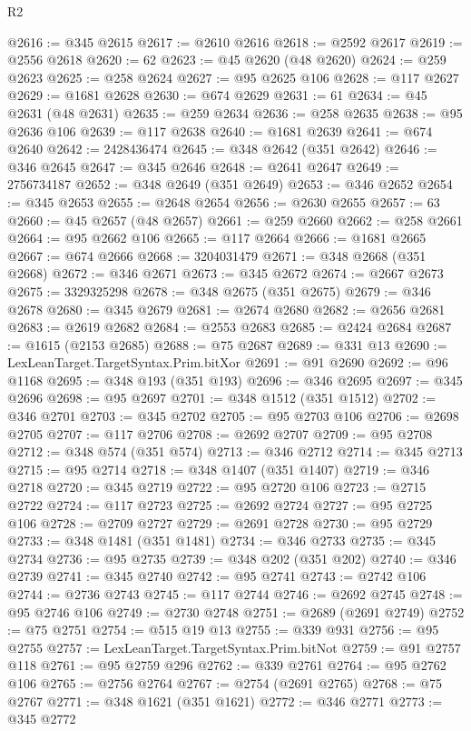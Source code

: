\begin{lexlean}{R2}
\begin{coremodule}
@2616 := @345 @2615
@2617 := @2610 @2616
@2618 := @2592 @2617
@2619 := @2556 @2618
@2620 := 62
@2623 := @45 @2620 (@48 @2620)
@2624 := @259 @2623
@2625 := @258 @2624
@2627 := @95 @2625 @106
@2628 := @117 @2627
@2629 := @1681 @2628
@2630 := @674 @2629
@2631 := 61
@2634 := @45 @2631 (@48 @2631)
@2635 := @259 @2634
@2636 := @258 @2635
@2638 := @95 @2636 @106
@2639 := @117 @2638
@2640 := @1681 @2639
@2641 := @674 @2640
@2642 := 2428436474
@2645 := @348 @2642 (@351 @2642)
@2646 := @346 @2645
@2647 := @345 @2646
@2648 := @2641 @2647
@2649 := 2756734187
@2652 := @348 @2649 (@351 @2649)
@2653 := @346 @2652
@2654 := @345 @2653
@2655 := @2648 @2654
@2656 := @2630 @2655
@2657 := 63
@2660 := @45 @2657 (@48 @2657)
@2661 := @259 @2660
@2662 := @258 @2661
@2664 := @95 @2662 @106
@2665 := @117 @2664
@2666 := @1681 @2665
@2667 := @674 @2666
@2668 := 3204031479
@2671 := @348 @2668 (@351 @2668)
@2672 := @346 @2671
@2673 := @345 @2672
@2674 := @2667 @2673
@2675 := 3329325298
@2678 := @348 @2675 (@351 @2675)
@2679 := @346 @2678
@2680 := @345 @2679
@2681 := @2674 @2680
@2682 := @2656 @2681
@2683 := @2619 @2682
@2684 := @2553 @2683
@2685 := @2424 @2684
@2687 := @1615 (@2153 @2685)
@2688 := @75 @2687
@2689 := @331 @13
@2690 := LexLeanTarget.TargetSyntax.Prim.bitXor
@2691 := @91 @2690
@2692 := @96 @1168
@2695 := @348 @193 (@351 @193)
@2696 := @346 @2695
@2697 := @345 @2696
@2698 := @95 @2697
@2701 := @348 @1512 (@351 @1512)
@2702 := @346 @2701
@2703 := @345 @2702
@2705 := @95 @2703 @106
@2706 := @2698 @2705
@2707 := @117 @2706
@2708 := @2692 @2707
@2709 := @95 @2708
@2712 := @348 @574 (@351 @574)
@2713 := @346 @2712
@2714 := @345 @2713
@2715 := @95 @2714
@2718 := @348 @1407 (@351 @1407)
@2719 := @346 @2718
@2720 := @345 @2719
@2722 := @95 @2720 @106
@2723 := @2715 @2722
@2724 := @117 @2723
@2725 := @2692 @2724
@2727 := @95 @2725 @106
@2728 := @2709 @2727
@2729 := @2691 @2728
@2730 := @95 @2729
@2733 := @348 @1481 (@351 @1481)
@2734 := @346 @2733
@2735 := @345 @2734
@2736 := @95 @2735
@2739 := @348 @202 (@351 @202)
@2740 := @346 @2739
@2741 := @345 @2740
@2742 := @95 @2741
@2743 := @2742 @106
@2744 := @2736 @2743
@2745 := @117 @2744
@2746 := @2692 @2745
@2748 := @95 @2746 @106
@2749 := @2730 @2748
@2751 := @2689 (@2691 @2749)
@2752 := @75 @2751
@2754 := @515 @19 @13
@2755 := @339 @931
@2756 := @95 @2755
@2757 := LexLeanTarget.TargetSyntax.Prim.bitNot
@2759 := @91 @2757 @118
@2761 := @95 @2759 @296
@2762 := @339 @2761
@2764 := @95 @2762 @106
@2765 := @2756 @2764
@2767 := @2754 (@2691 @2765)
@2768 := @75 @2767
@2771 := @348 @1621 (@351 @1621)
@2772 := @346 @2771
@2773 := @345 @2772

\end{coremodule}
\end{lexlean}
